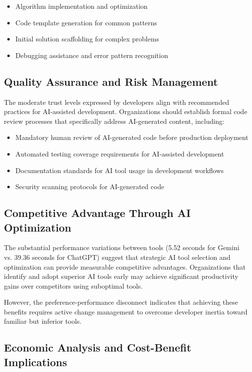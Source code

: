 \documentclass[conference]{IEEEtran}
\begin{document}
\begin{itemize}
    \item Algorithm implementation and optimization
    \item Code template generation for common patterns
    \item Initial solution scaffolding for complex problems
    \item Debugging assistance and error pattern recognition
\end{itemize}

\subsection{Quality Assurance and Risk Management}

The moderate trust levels expressed by developers align with recommended practices for AI-assisted development. Organizations should establish formal code review processes that specifically address AI-generated content, including:

\begin{itemize}
    \item Mandatory human review of AI-generated code before production deployment
    \item Automated testing coverage requirements for AI-assisted development
    \item Documentation standards for AI tool usage in development workflows
    \item Security scanning protocols for AI-generated code
\end{itemize}

\subsection{Competitive Advantage Through AI Optimization}

The substantial performance variations between tools (5.52 seconds for Gemini vs. 39.36 seconds for ChatGPT) suggest that strategic AI tool selection and optimization can provide measurable competitive advantages. Organizations that identify and adopt superior AI tools early may achieve significant productivity gains over competitors using suboptimal tools.

However, the preference-performance disconnect indicates that achieving these benefits requires active change management to overcome developer inertia toward familiar but inferior tools.

\subsection{Economic Analysis and Cost-Benefit Implications}
\end{document}
